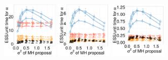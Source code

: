   \begin{figure}[H]
  \begin{minipage}[h!]{0.99\linewidth}
    \includegraphics [width=0.24\textwidth, angle=0]{figs/new_whole_exp_figs/exp_alpha_dim3.pdf}
	\hspace{.6in}
    \includegraphics [width=0.24\textwidth, angle=0]{figs/new_whole_exp_figs/exp_alpha_dim5.pdf}
	\hspace{.6in}
    \includegraphics [width=0.24\textwidth, angle=0]{figs/new_whole_exp_figs/exp_alpha_dim10.pdf}
  \end{minipage}


\end{figure}
